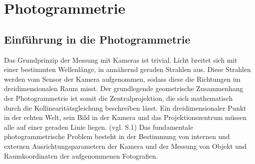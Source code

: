 \chapter{Photogrammetrie}

\section{Einführung in die Photogrammetrie}

Das Grundprinzip der Messung mit Kameras ist trivial. Licht breitet sich mit einer bestimmten Wellenlänge, in annähernd geraden Strahlen aus. Diese Strahlen werden vom Sensor der Kamera aufgenommen, sodass diese die Richtungen im dreidimensionalen Raum misst. Der grundlegende geometrische Zusammenhang der Photogrammetrie ist somit die Zentralprojektion, die sich mathematisch durch die Kollinearitätsgleichung beschreiben lässt. Ein dreidimensionaler Punkt in der echten Welt, sein Bild in der Kamera und das Projektionszentrum müssen alle auf einer geraden Linie liegen. (vgl. \cite{fiundations_pg} S.1) Das fundamentale photogrammetrische Problem besteht in der Bestimmung von internen und externen Ausrichtungsparametern der Kamera und der  Messung von Objekt und Raumkoordinaten der aufgenommenen Fotografien. 


